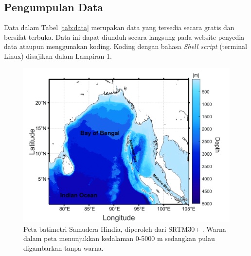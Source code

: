 \begin{spacing}{1.5}
	\subsection[Pengumpulan Data]{Pengumpulan Data}
	Data dalam Tabel \ref{tab:data} merupakan data yang tersedia secara gratis dan bersifat terbuka. Data ini dapat diunduh secara langsung pada website penyedia data ataupun menggunakan koding. Koding dengan bahasa \textit{Shell script} (terminal Linux) disajikan dalam Lampiran 1.
	
	\begin{figure}[H]
		\centering
		\includegraphics[width=12cm]{contents/Figures/Batimetri_edit_compress}
		\caption{Peta batimetri Samudera Hindia, diperoleh dari SRTM30+ \protect\cite{becker2009global}. Warna dalam peta menunjukkan kedalaman 0-5000 m sedangkan pulau digambarkan tanpa warna.}
		\label{fig:domain}
	\end{figure}
\end{spacing}
\vspace{-0.5pc}
